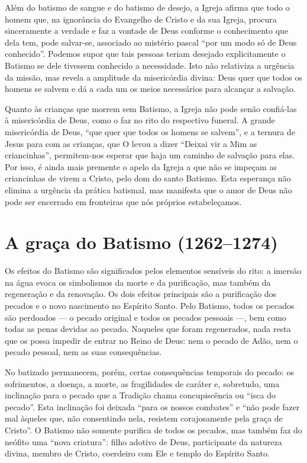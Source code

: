 Além do batismo de sangue e do batismo de desejo, a Igreja afirma que todo o homem que, na ignorância do Evangelho de Cristo e da sua Igreja, procura sinceramente a verdade e faz a vontade de Deus conforme o conhecimento que dela tem, pode salvar-se, associado ao mistério pascal ``por um modo só de Deus conhecido''. Podemos supor que tais pessoas teriam desejado explicitamente o Batismo se dele tivessem conhecido a necessidade. Isto não relativiza a urgência da missão, mas revela a amplitude da misericórdia divina: Deus quer que todos os homens se salvem e dá a cada um os meios necessários para alcançar a salvação.

Quanto às crianças que morrem sem Batismo, a Igreja não pode senão confiá-las à misericórdia de Deus, como o faz no rito do respectivo funeral. A grande misericórdia de Deus, ``que quer que todos os homens se salvem'', e a ternura de Jesus para com as crianças, que O levou a dizer ``Deixai vir a Mim as criancinhas'', permitem-nos esperar que haja um caminho de salvação para elas. Por isso, é ainda mais premente o apelo da Igreja a que não se impeçam as criancinhas de virem a Cristo, pelo dom do santo Batismo. Esta esperança não elimina a urgência da prática batismal, mas manifesta que o amor de Deus não pode ser encerrado em fronteiras que nós próprios estabeleçamos.

\section{A graça do Batismo (1262--1274)}

Os efeitos do Batismo são significados pelos elementos sensíveis do rito: a imersão na água evoca os simbolismos da morte e da purificação, mas também da regeneração e da renovação. Os dois efeitos principais são a purificação dos pecados e o novo nascimento no Espírito Santo. Pelo Batismo, todos os pecados são perdoados --- o pecado original e todos os pecados pessoais ---, bem como todas as penas devidas ao pecado. Naqueles que foram regenerados, nada resta que os possa impedir de entrar no Reino de Deus: nem o pecado de Adão, nem o pecado pessoal, nem as suas consequências.

No batizado permanecem, porém, certas consequências temporais do pecado: os sofrimentos, a doença, a morte, as fragilidades de caráter e, sobretudo, uma inclinação para o pecado que a Tradição chama concupiscência ou ``isca do pecado''. Esta inclinação foi deixada ``para os nossos combates'' e ``não pode fazer mal àqueles que, não consentindo nela, resistem corajosamente pela graça de Cristo''. O Batismo não somente purifica de todos os pecados, mas também faz do neófito uma ``nova criatura'': filho adotivo de Deus, participante da natureza divina, membro de Cristo, coerdeiro com Ele e templo do Espírito Santo.

